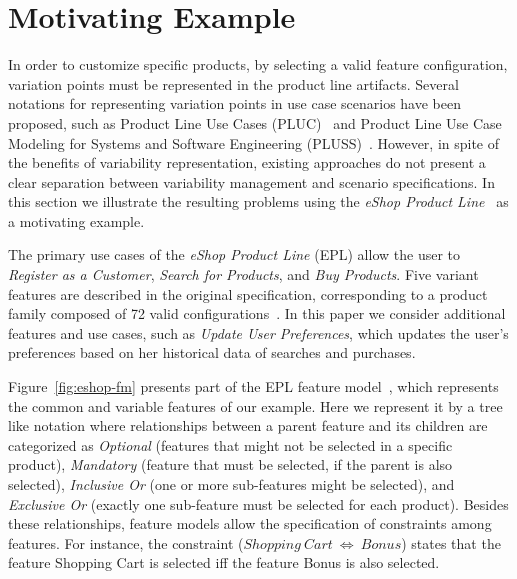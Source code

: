 \section{Motivating Example}
\label{sec:problem}

In order to customize specific products, by selecting a valid feature
configuration, variation points must be represented in the product line
artifacts. Several notations for representing variation points in use case
scenarios have been proposed, such as Product Line Use Cases
(PLUC)~\cite{Bertolino:2003aa} and Product Line Use Case Modeling for Systems
and Software Engineering (PLUSS)~\cite{Eriksson:2005aa}. However, in spite of
the benefits of variability representation, existing approaches do not present
a clear separation between variability management and scenario specifications. In this
section we illustrate the resulting problems using the \emph{eShop Product
Line}~\cite{Pohl:eshop} as a motivating example.

The primary use cases of the \emph{eShop Product Line} (EPL) allow the user to
\emph{Register as a Customer}, \emph{Search for Products}, and \emph{Buy
Products}.  Five variant features are described in the original specification,
corresponding to a product family composed of 72 valid
configurations~\cite{Pohl:eshop}. In this paper we consider additional features
and use cases, such as \emph{Update User Preferences}, which updates the user's
preferences based on her historical data of searches and purchases.

Figure~\ref{fig:eshop-fm} presents part of the
EPL feature model~\cite{Gheyi:2006aa,Czarnecki:2000aa}, which represents the
common and variable features of our example. Here we represent it by a tree like
notation where relationships between a parent feature and its children are
categorized as \emph{Optional} (features that might not be selected in a specific product), \emph{Mandatory} (feature that must be selected, if the parent
is also selected), \emph{Inclusive Or} (one or more sub-features might be selected), and
\emph{Exclusive Or} (exactly one sub-feature must be selected for each product).
Besides these relationships, feature models allow the specification of
constraints among features. For instance, the constraint ($Shopping\ Cart\
\Leftrightarrow\ Bonus$) states that the feature Shopping Cart is selected iff
the feature Bonus is also selected.


